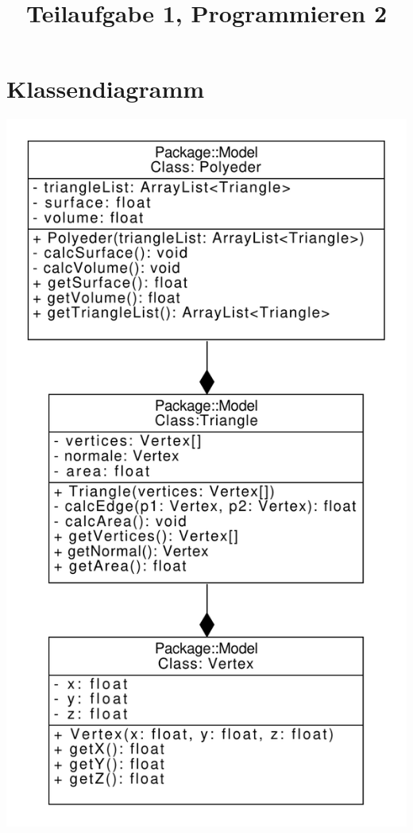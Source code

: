 \documentclass[a4paper,11pt]{scrartcl}
\title{Teilaufgabe 1, Programmieren 2}
\begin{document}
	\section*{Klassendiagramm}
	
	\begin{center}
		\includegraphics[height=.5\textheight]{PolyederUML}
	\end{center}
\end{document}
